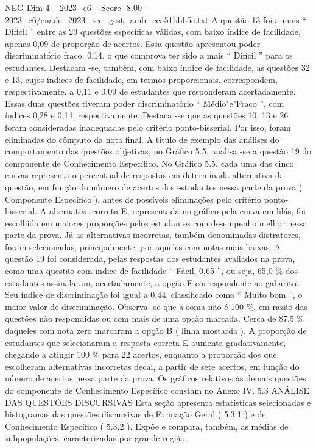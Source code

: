 \begin{textsample}{NEG Dim 4 – 2023\_c6 – Score -8.00 – 2023\_c6/enade\_2023\_tec\_gest\_amb\_cca51bbb5c.txt}
A questão 13 foi a mais “ Difícil ” entre as 29 questões específicas válidas, com baixo índice de facilidade, apenas 0,09 de proporção de acertos.
Essa questão apresentou poder discriminatório fraco, 0,14, o que comprova ter sido a mais “ Difícil ” para os estudantes.
Destacam -se, também, com baixo índice de facilidade, as questões 32 e 13, cujos índices de facilidade, em termos proporcionais, correspondem, respectivamente, a 0,11 e 0,09 de estudantes que responderam acertadamente.
Essas duas questões tiveram poder discriminatório “ Médio"e"Fraco ”, com índices 0,28 e 0,14, respectivamente.
Destaca -se que as questões 10, 13 e 26 foram consideradas inadequadas pelo critério ponto-bisserial.
Por isso, foram eliminadas do cômputo da nota final.
A título de exemplo das análises do comportamento das questões objetivas, no Gráfico 5.5, analisa -se a questão 19 do componente de Conhecimento Específico.
No Gráfico 5.5, cada uma das cinco curvas representa o percentual de respostas em determinada alternativa da questão, em função do número de acertos dos estudantes nessa parte da prova ( Componente Específico ), antes de possíveis eliminações pelo critério ponto-bisserial.
A alternativa correta E, representada no gráfico pela curva em lilás, foi escolhida em maiores proporções pelos estudantes com desempenho melhor nessa parte da prova.
Já as alternativas incorretas, também denominadas distratores, foram selecionadas, principalmente, por aqueles com notas mais baixas.
A questão 19 foi considerada, pelas respostas dos estudantes avaliados na prova, como uma questão com índice de facilidade “ Fácil, 0,65 ”, ou seja, 65,0 \% dos estudantes assinalaram, acertadamente, a opção E correspondente ao gabarito.
Seu índice de discriminação foi igual a 0,44, classificado como “ Muito bom ”, o maior valor de discriminação.
Observa -se que a soma não é 100 \%, em razão das questões não respondidas ou com mais de uma opção marcada.
Cerca de 87,5 \% daqueles com nota zero marcaram a opção B ( linha mostarda ).
A proporção de estudantes que selecionaram a resposta correta E aumenta gradativamente, chegando a atingir 100 \% para 22 acertos, enquanto a proporção dos que escolheram alternativas incorretas decai, a partir de sete acertos, em função do número de acertos nessa parte da prova.
Os gráficos relativos às demais questões do componente de Conhecimento Específico constam no Anexo IV. 5.3 ANÁLISE DAS QUESTÕES DISCURSIVAS Esta seção apresenta estatísticas selecionadas e histogramas das questões discursivas de Formação Geral ( 5.3.1 ) e de Conhecimento Específico ( 5.3.2 ).
Expõe e compara, também, as médias de subpopulações, caracterizadas por grande região.

\end{textsample}
